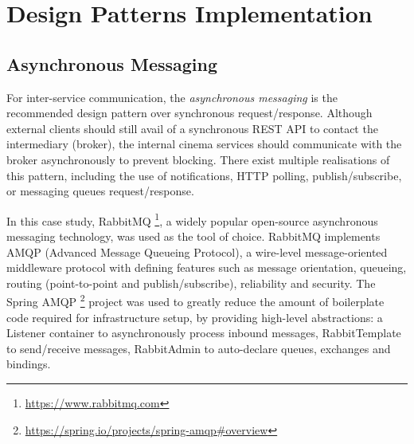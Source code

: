\section{Design Patterns Implementation}

\subsection{Asynchronous Messaging}

For inter-service communication, the \textit{asynchronous messaging} is the recommended design pattern over synchronous request/response. Although external clients should still avail of a synchronous REST API to contact the intermediary (broker), the internal cinema services should communicate with the broker asynchronously to prevent blocking. There exist multiple realisations of this pattern, including the use of notifications, HTTP polling, publish/subscribe, or messaging queues request/response.

In this case study, RabbitMQ \footnote{\url{https://www.rabbitmq.com}}, a widely popular open-source asynchronous messaging technology, was used as the tool of choice. RabbitMQ implements AMQP (Advanced Message Queueing Protocol), a wire-level message-oriented middleware protocol with defining features such as message orientation, queueing, routing (point-to-point and publish/subscribe), reliability and security. The Spring AMQP \footnote{\url{https://spring.io/projects/spring-amqp\#overview}} project was used to greatly reduce the amount of boilerplate code required for infrastructure setup, by providing high-level abstractions: a Listener container to asynchronously process inbound messages, RabbitTemplate to send/receive messages, RabbitAdmin to auto-declare queues, exchanges and bindings.

